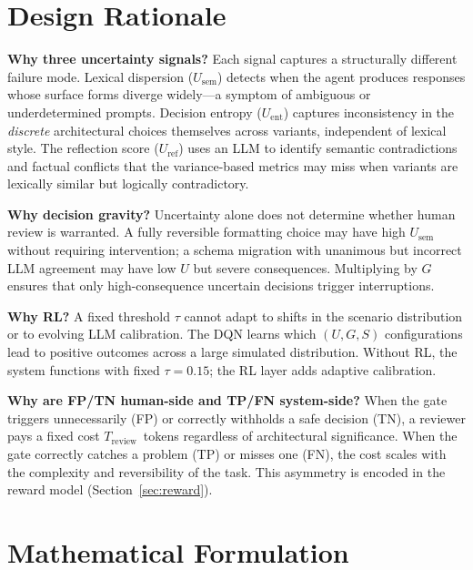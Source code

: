 \documentclass[conference]{IEEEtran}
\newcommand{\Usem}{U_{\mathrm{sem}}}
\newcommand{\Uent}{U_{\mathrm{ent}}}
\newcommand{\Uref}{U_{\mathrm{ref}}}
\newcommand{\Treview}{T_{\mathrm{review}}}
\begin{document}
\section{Design Rationale}\label{sec:rationale}

\textbf{Why three uncertainty signals?}
Each signal captures a structurally different failure mode.
Lexical dispersion ($\Usem$) detects when the agent produces responses whose
surface forms diverge widely---a symptom of ambiguous or underdetermined
prompts.
Decision entropy ($\Uent$) captures inconsistency in the \emph{discrete}
architectural choices themselves across variants, independent of lexical
style.
The reflection score ($\Uref$) uses an LLM to identify semantic
contradictions and factual conflicts that the variance-based metrics may miss
when variants are lexically similar but logically contradictory.

\textbf{Why decision gravity?}
Uncertainty alone does not determine whether human review is warranted.
A fully reversible formatting choice may have high $\Usem$ without requiring
intervention; a schema migration with unanimous but incorrect LLM agreement
may have low $U$ but severe consequences.
Multiplying by $G$ ensures that only high-consequence uncertain decisions
trigger interruptions.

\textbf{Why RL?}
A fixed threshold $\tau$ cannot adapt to shifts in the scenario distribution
or to evolving LLM calibration.
The DQN learns which $(U, G, S)$ configurations lead to positive outcomes
across a large simulated distribution.
Without RL, the system functions with fixed $\tau{=}0.15$; the RL layer
adds adaptive calibration.

\textbf{Why are FP/TN human-side and TP/FN system-side?}
When the gate triggers unnecessarily (FP) or correctly withholds a safe
decision (TN), a reviewer pays a fixed cost $\Treview$~tokens regardless of
architectural significance.
When the gate correctly catches a problem (TP) or misses one (FN), the cost
scales with the complexity and reversibility of the task.
This asymmetry is encoded in the reward model (Section~\ref{sec:reward}).

\section{Mathematical Formulation}\label{sec:math}
\end{document}
